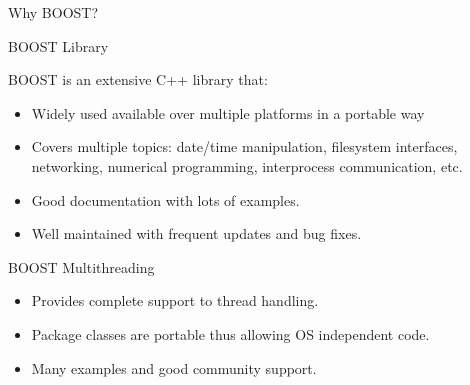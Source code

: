 \documentclass[8pt]{beamer}
\begin{document}
\begin{frame}{Why BOOST?}
 
\begin{block}{BOOST Library}

BOOST is an extensive C++ library that:

\begin{itemize}
  \item Widely used available over multiple platforms in a portable way 
  \item Covers multiple topics: date/time manipulation, filesystem interfaces, networking, numerical programming, interprocess communication, etc.
  \item Good documentation with lots of examples.
  \item Well maintained with frequent updates and bug fixes. 
\end{itemize}

\end{block}

\begin{block}{BOOST Multithreading}
 
\begin{itemize}
  \item Provides complete support to thread handling.
  \item Package classes are portable thus allowing OS independent code.
  \item Many examples and good community support. 
\end{itemize}
 
\end{block}
 
\end{frame}
\end{document}
